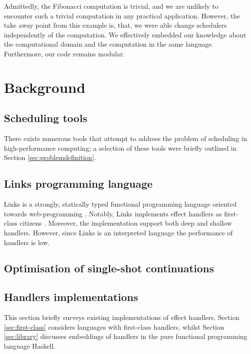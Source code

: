 \documentclass[preprint,10pt,numbers]{sigplanconf}
\begin{document}
Admittedly, the Fibonacci computation is trivial, and we are unlikely to encounter such a trivial computation in any practical application. However, the take away point from this example is, that, we were able change schedulers independently of the computation. We effectively embedded our knowledge about the computational domain and the computation in the same language. Furthermore, our code remains modular.

  \section{Background}\label{sec:background}
  \subsection{Scheduling tools}\label{sec:tools}
There exists numerous tools that attempt to address the problem of scheduling in high-performance computing; a selection of these tools were briefly outlined in Section \ref{sec:problemdefinition}.
  \subsection{Links programming language}
  Links is a strongly, statically typed functional programming language oriented towards web-programming \cite{Cooper2006}. Notably, Links implements effect handlers as first-class citizens \cite{Hillerstrom2015}. Moreover, the implementation support both deep and shallow handlers. However, since Links is an interpreted language the performance of handlers is low.

  \subsection{Optimisation of single-shot continuations}

  \subsection{Handlers implementations}
  This section briefly surveys existing implementations of effect handlers. Section \ref{sec:first-class} considers languages with first-class handlers, whilst Section \ref{sec:library} discusses embeddings of handlers in the pure functional programming language Haskell.
\end{document}
